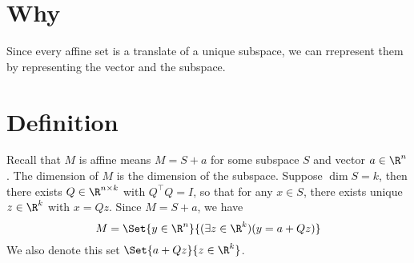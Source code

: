 
\section*{Why}

Since every affine set is a translate of a unique subspace, we can rrepresent them by representing the vector and the subspace.

\section*{Definition}

Recall that $M$ is affine means $M = S + a$ for some subspace $S$ and vector $a \in \R ^n$.
The dimension of $M$ is the dimension of the subspace.
Suppose $\dim S = k$, then there exists $Q \in \R ^{n \times k}$ with $Q^\top  Q = I$, so that for any $x \in S$, there exists unique $z \in \R ^k$ with $x = Qz$.
Since $M = S + a$, we have
  \[
M = \Set{y \in \R ^n}{(\exists z \in \R ^k)(y = a + Qz)}
  \]
We also denote this set $\Set{a + Qz}{z \in \R ^k}$.

\blankpage